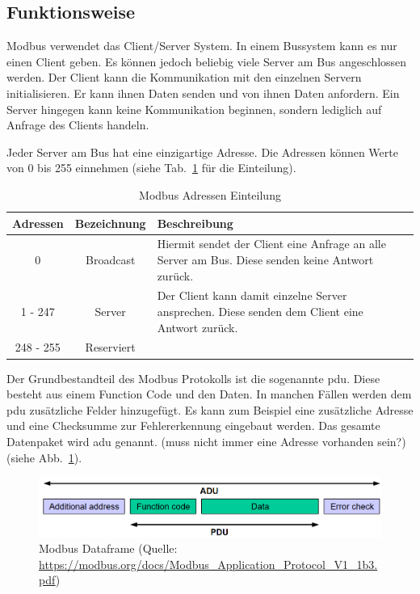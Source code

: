 \subsection{Funktionsweise}\label{modbus_funktionsweise}
Modbus verwendet das Client/Server System. In einem Bussystem kann es nur einen Client geben. Es können jedoch beliebig viele Server am Bus angeschlossen werden. Der Client kann die Kommunikation mit den einzelnen Servern initialisieren. Er kann ihnen Daten senden und von ihnen Daten anfordern. Ein Server hingegen kann keine Kommunikation beginnen, sondern lediglich auf Anfrage des Clients handeln.

Jeder Server am Bus hat eine einzigartige Adresse. Die Adressen können Werte von 0 bis 255 einnehmen (siehe Tab.~\ref{tab:modbus_adressen} für die Einteilung). 
\begin{table}[h]
	\caption{Modbus Adressen Einteilung \label{tab:modbus_adressen}}
	\begin{tabularx}{\textwidth}{@{}c|c|X@{}}
		\toprule
		\textbf{Adressen} & \textbf{Bezeichnung} & \textbf{Beschreibung} \\
		\midrule
		0 & Broadcast & Hiermit sendet der Client eine Anfrage an alle Server am Bus. Diese senden keine Antwort zurück. \\
		1 - 247 & Server & Der Client kann damit einzelne Server ansprechen. Diese senden dem Client eine Antwort zurück. \\
		248 - 255 & Reserviert & \\
		\bottomrule
	\end{tabularx}
\end{table}

Der Grundbestandteil des Modbus Protokolls ist die sogenannte \acf{pdu}. Diese besteht aus einem Function Code und den Daten. In manchen Fällen werden dem \acs{pdu} zusätzliche Felder hinzugefügt. Es kann zum Beispiel eine zusätzliche Adresse und eine Checksumme zur Fehlererkennung eingebaut werden. Das gesamte Datenpaket wird \acf{adu} genannt. (muss nicht immer eine Adresse vorhanden sein?)
(siehe Abb.~\ref{fig:modbus_adu_pdu}).
\begin{figure}[ht]
	\centering
	\includegraphics[width=1.0\linewidth]{Bilder/General_Modbus_Frame}
	\caption{Modbus Dataframe (Quelle: \url{https://modbus.org/docs/Modbus_Application_Protocol_V1_1b3.pdf})}
	\label{fig:modbus_adu_pdu}
\end{figure}

